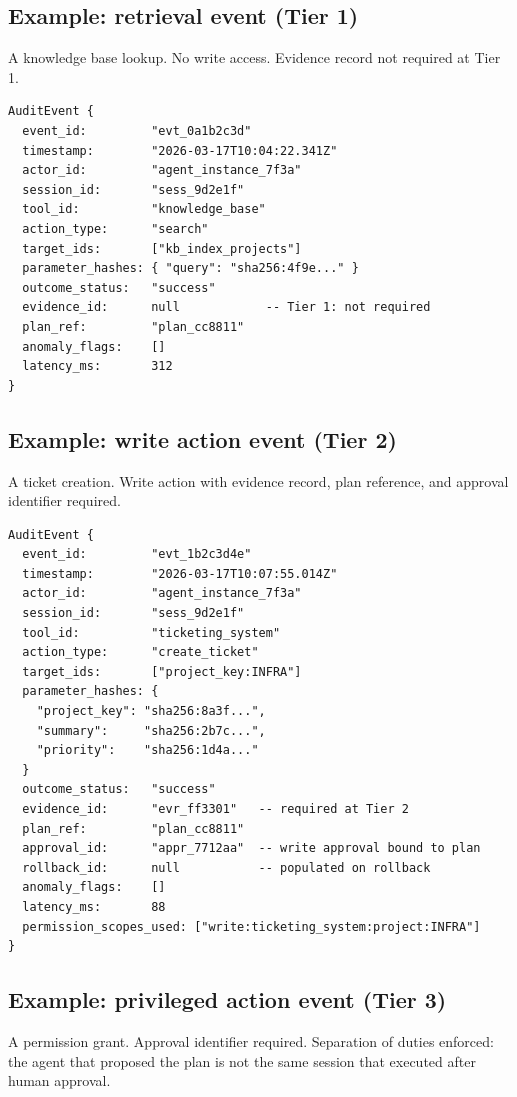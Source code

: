\documentclass[11pt]{article}
\begin{document}
\subsection{Example: retrieval event (Tier 1)}
A knowledge base lookup. No write access. Evidence record not required at Tier 1.

\begin{verbatim}
AuditEvent {
  event_id:         "evt_0a1b2c3d"
  timestamp:        "2026-03-17T10:04:22.341Z"
  actor_id:         "agent_instance_7f3a"
  session_id:       "sess_9d2e1f"
  tool_id:          "knowledge_base"
  action_type:      "search"
  target_ids:       ["kb_index_projects"]
  parameter_hashes: { "query": "sha256:4f9e..." }
  outcome_status:   "success"
  evidence_id:      null            -- Tier 1: not required
  plan_ref:         "plan_cc8811"
  anomaly_flags:    []
  latency_ms:       312
}
\end{verbatim}

\subsection{Example: write action event (Tier 2)}
A ticket creation. Write action with evidence record, plan reference, and approval identifier required.

\begin{verbatim}
AuditEvent {
  event_id:         "evt_1b2c3d4e"
  timestamp:        "2026-03-17T10:07:55.014Z"
  actor_id:         "agent_instance_7f3a"
  session_id:       "sess_9d2e1f"
  tool_id:          "ticketing_system"
  action_type:      "create_ticket"
  target_ids:       ["project_key:INFRA"]
  parameter_hashes: {
    "project_key": "sha256:8a3f...",
    "summary":     "sha256:2b7c...",
    "priority":    "sha256:1d4a..."
  }
  outcome_status:   "success"
  evidence_id:      "evr_ff3301"   -- required at Tier 2
  plan_ref:         "plan_cc8811"
  approval_id:      "appr_7712aa"  -- write approval bound to plan
  rollback_id:      null           -- populated on rollback
  anomaly_flags:    []
  latency_ms:       88
  permission_scopes_used: ["write:ticketing_system:project:INFRA"]
}
\end{verbatim}

\subsection{Example: privileged action event (Tier 3)}
A permission grant. Approval identifier required. Separation of duties enforced: the agent that proposed the plan is not the same session that executed after human approval.
\end{document}
